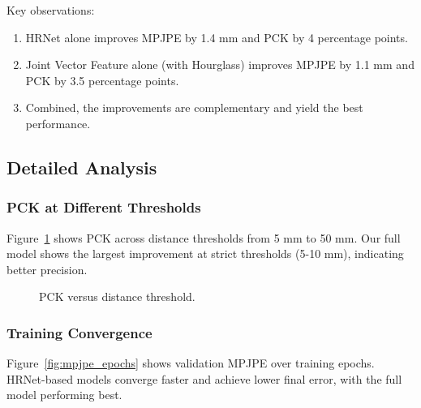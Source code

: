 Key observations:
\begin{enumerate}
    \item HRNet alone improves MPJPE by 1.4 mm and PCK by 4 percentage points.
    \item Joint Vector Feature alone (with Hourglass) improves MPJPE by 1.1 mm and PCK by 3.5 percentage points.
    \item Combined, the improvements are complementary and yield the best performance.
\end{enumerate}

\subsection{Detailed Analysis}

\subsubsection{PCK at Different Thresholds}
Figure~\ref{fig:pck_curve} shows PCK across distance thresholds from 5 mm to 50 mm. Our full model shows the largest improvement at strict thresholds (5-10 mm), indicating better precision.

\begin{figure}[ht]
\footnotesize
  \centering
  \caption{PCK versus distance threshold.}
  \label{fig:pck_curve}
\end{figure}

\subsubsection{Training Convergence}
Figure~\ref{fig:mpjpe_epochs} shows validation MPJPE over training epochs. HRNet-based models converge faster and achieve lower final error, with the full model performing best.


